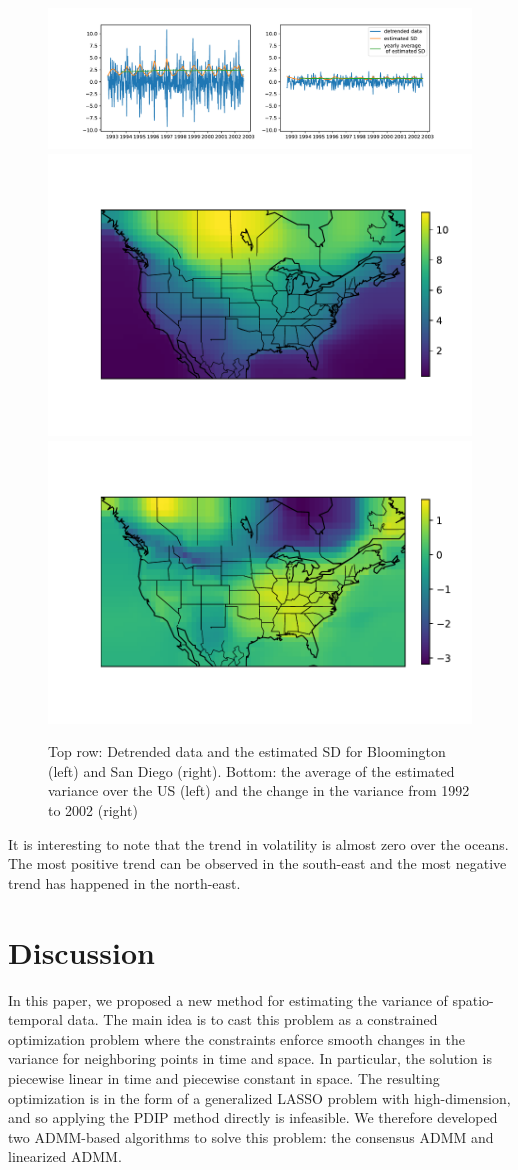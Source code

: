 \documentclass{article}
\begin{document}
\begin{figure}[tb]
  \centering
  \includegraphics[width=.9\columnwidth]{Figures/estimatedSD}\\
  \includegraphics[width=.45\linewidth]{Figures/avg_estimatedVar}
  \includegraphics[width=.45\linewidth]{Figures/avg_change_estimatedVar}
  \caption{Top row: Detrended data and the estimated SD for
    Bloomington (left) and San Diego (right). Bottom: the
    average of the estimated variance over the US (left) and the
    change in the variance from 1992 to 2002 (right)} 
  \label{fig:avg_change_estimatedSD}
\end{figure} 
It is interesting to note that the trend in volatility is almost zero
over the oceans. The most positive trend can be observed in the
south-east and the most negative trend has happened in the north-east.  
 

\section{Discussion}
In this paper, we proposed a new method for estimating the variance of
spatio-temporal data. The main idea is to cast this problem as a
constrained optimization problem where the constraints enforce smooth
changes in the variance for neighboring points in time and space. In
particular, the solution is piecewise linear in time and piecewise
constant in space. The resulting optimization is in the form of a
generalized LASSO problem with high-dimension, and so applying the
PDIP method directly is infeasible. We therefore developed two
ADMM-based algorithms to solve this problem: the consensus ADMM and
linearized ADMM. 
\end{document}
